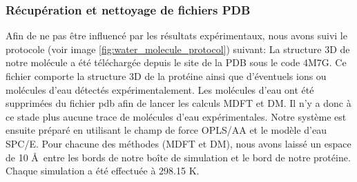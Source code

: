\subsubsection{Récupération et nettoyage de fichiers PDB}
Afin de ne pas être influencé par les résultats expérimentaux, nous avons suivi le protocole (voir image \ref{fig:water_molecule_protocol}) suivant: La structure 3D de notre molécule a été téléchargée depuis le site de la PDB sous le code 4M7G. Ce fichier comporte la structure 3D de la protéine ainsi que d'éventuels ions ou molécules d'eau détectés expérimentalement. Les molécules d'eau ont été supprimées du fichier pdb afin de lancer les calculs MDFT et DM. Il n'y a donc à ce stade plus aucune trace de molécules d'eau expérimentales. Notre système est ensuite préparé en utilisant le champ de force OPLS/AA\cite{jorgensen_opls_1988} et le modèle d'eau SPC/E\cite{berendsen_missing_1987}. Pour chacune des méthodes (MDFT et DM), nous avons laissé un espace de 10 \AA\ entre les bords de notre boîte de simulation et le bord de notre protéine. Chaque simulation a été effectuée à 298.15 K.



